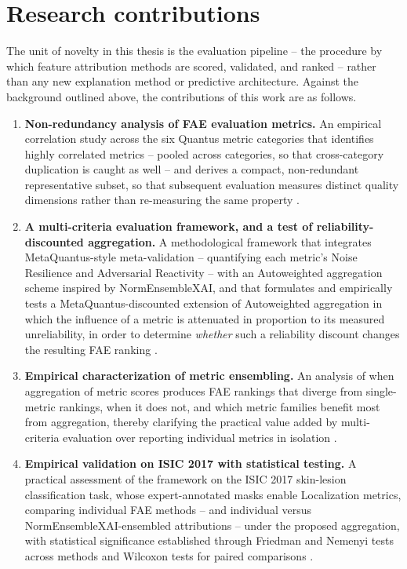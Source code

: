 \section{Research contributions}
\label{sec:celePracy}

The unit of novelty in this thesis is the evaluation pipeline -- the procedure by
which feature attribution methods are scored, validated, and ranked -- rather
than any new explanation method or predictive architecture. Against the
background outlined above, the contributions of this work are as follows.

\begin{enumerate}
    \item \textbf{Non-redundancy analysis of FAE evaluation metrics.} An
    empirical correlation study across the six Quantus metric categories that
    identifies highly correlated metrics -- pooled across categories, so that
    cross-category duplication is caught as well -- and derives a
    compact, non-redundant representative subset, so that subsequent evaluation
    measures distinct quality dimensions rather than re-measuring the same
    property \cite{hedstrom2023quantus, bommer2024finding}.

    \item \textbf{A multi-criteria evaluation framework, and a test of
    reliability-discounted aggregation.} A methodological framework that
    integrates MetaQuantus-style meta-validation -- quantifying each metric's
    Noise Resilience and Adversarial Reactivity -- with an Autoweighted
    aggregation scheme inspired by NormEnsembleXAI, and that formulates and
    empirically tests a MetaQuantus-discounted extension of Autoweighted
    aggregation in which the influence of a metric is attenuated in proportion
    to its measured unreliability, in order to determine \emph{whether} such a
    reliability discount changes the resulting FAE ranking
    \cite{hedstrom2024metaquantus, hryniewska2024normensemblexai}.

    \item \textbf{Empirical characterization of metric ensembling.} An analysis
    of when aggregation of metric scores produces FAE rankings that diverge from
    single-metric rankings, when it does not, and which metric families benefit
    most from aggregation, thereby clarifying the practical value added by
    multi-criteria evaluation over reporting individual metrics in isolation
    \cite{hedstrom2023quantus}.

    \item \textbf{Empirical validation on ISIC 2017 with statistical testing.}
    A practical assessment of the framework on the ISIC 2017 skin-lesion
    classification task, whose expert-annotated masks enable Localization
    metrics, comparing individual FAE methods -- and individual versus
    NormEnsembleXAI-ensembled attributions -- under the proposed aggregation, with
    statistical significance established through Friedman and Nemenyi tests
    across methods and Wilcoxon tests for paired comparisons
    \cite{codella2018isic, hryniewska2024normensemblexai}.
\end{enumerate}


